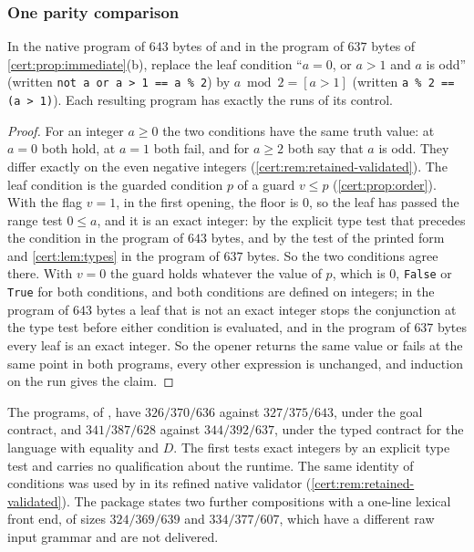\subsubsection*{One parity comparison}

\begin{proposition}\label{cert:prop:parity}
In the native program of $643$ bytes of  and in the
program of $637$ bytes of \cref{cert:prop:immediate}(b), replace the leaf
condition ``$a=0$, or $a>1$ and $a$ is odd'' (written
\texttt{not a or a > 1 == a \% 2}) by $a\bmod 2=[a>1]$ (written
\texttt{a \% 2 == (a > 1)}). Each resulting program has exactly the runs of its
control.
\end{proposition}
\begin{proof}
For an integer $a\ge 0$ the two conditions have the same truth value: at
$a=0$ both hold, at $a=1$ both fail, and for $a\ge 2$ both say that $a$ is odd.
They differ exactly on the even negative integers
(\cref{cert:rem:retained-validated}). The leaf condition is the guarded
condition $p$ of a guard $v\le p$ (\cref{cert:prop:order}). With the flag
$v=1$, in the first opening, the floor is $0$, so the leaf has passed the range
test $0\le a$, and it is an exact integer: by the explicit type test that
precedes the condition in the program of $643$ bytes, and by the test of the
printed form and \cref{cert:lem:types} in the program of $637$ bytes. So the
two conditions agree there. With $v=0$ the guard holds whatever the value of
$p$, which is $0$, \texttt{False} or \texttt{True} for both conditions, and
both conditions are defined on integers; in the program of $643$ bytes a leaf
that is not an exact integer stops the conjunction at the type test before
either condition is evaluated, and in the program of $637$ bytes every leaf is
an exact integer. So the opener returns the same value or fails at the same
point in both programs, every other expression is unchanged, and induction on
the run gives the claim.
\end{proof}

The programs, of , have $326/370/636$ against
$327/375/643$, under the goal contract, and $341/387/628$ against $344/392/637$,
under the typed contract for the language with equality and $D$. The first
tests exact integers by an explicit type test and carries no qualification
about the runtime. The same identity of conditions was used by
 in its refined native validator
(\cref{cert:rem:retained-validated}). The package states two further
compositions with a one-line lexical front end, of sizes $324/369/639$ and
$334/377/607$, which have a different raw input grammar and are not delivered.

